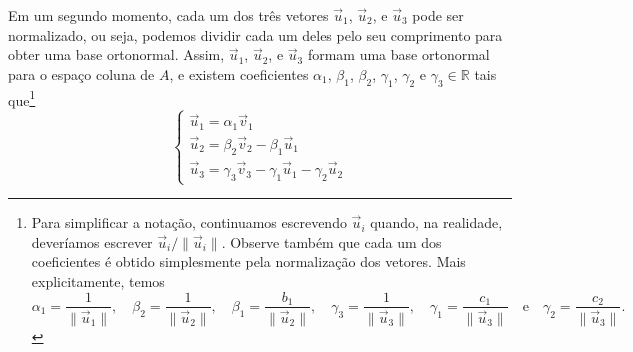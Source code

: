 \documentclass[../livro.tex]{subfiles}  %
\begin{document}
Em um segundo momento, cada um dos três vetores $\vec{u}_1$, $\vec{u}_2$, e $\vec{u}_3$ pode ser normalizado, ou seja, podemos dividir cada um deles pelo seu comprimento para obter uma base ortonormal. Assim, $\vec{u}_1$, $\vec{u}_2$, e $\vec{u}_3$ formam uma base ortonormal para o espaço coluna de $A$, e existem coeficientes $\alpha_1$, $\beta_1$, $\beta_2$, $\gamma_1$, $\gamma_2$ e $\gamma_3 \in \mathbb{R}$ tais que\footnote{Para simplificar a notação, continuamos escrevendo $\vec{u}_i$ quando, na realidade, deveríamos escrever $\vec{u}_i/\|\vec{u}_i\|$. Observe também que cada um dos coeficientes é obtido simplesmente pela normalização dos vetores. Mais explicitamente, temos
\begin{equation}
\alpha_1 = \frac{1}{\|\vec{u}_1\|}, \quad \beta_2 = \frac{1}{\|\vec{u}_2\|}, \quad \beta_1 = \frac{b_1}{\|\vec{u}_2\|}, \quad \gamma_3 = \frac{1}{\|\vec{u}_3\|}, \quad \gamma_1 = \frac{c_1}{\|\vec{u}_3\|} \quad \text{e} \quad \gamma_2 = \frac{c_2}{\|\vec{u}_3\|}.
\end{equation}}
\begin{equation}
\begin{cases}
\vec{u}_1 = \alpha_1\vec{v}_1 \\ 
\vec{u}_2 = \beta_2 \vec{v}_2 - \beta_1 \vec{u}_1 \\
\vec{u}_3 = \gamma_3 \vec{v}_3 - \gamma_1 \vec{u}_1 - \gamma_2 \vec{u}_2
\end{cases}
\end{equation}
\end{document}
